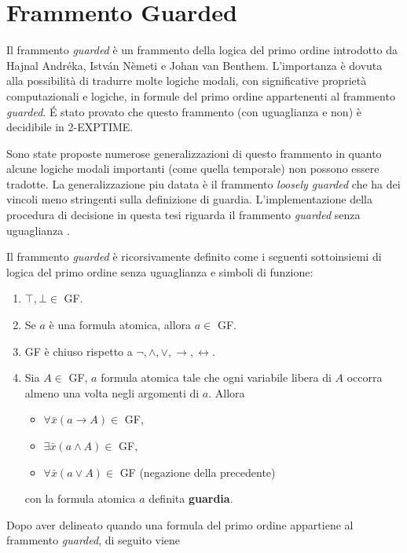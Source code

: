 \let\cleardoublepage\relax
\chapter{Frammento Guarded}
Il frammento \emph{guarded} è un frammento della logica del primo ordine introdotto da Hajnal Andréka,
István Nèmeti e Johan van Benthem. L'importanza è dovuta alla possibilità  di tradurre 
molte logiche modali, con significative proprietà computazionali e logiche, in formule del primo ordine 
appartenenti al frammento \emph{guarded}. \'E stato provato che questo frammento (con uguaglianza e non) 
è decidibile in \textsc{2-EXPTIME}. 

Sono state proposte numerose generalizzazioni di questo frammento in quanto
alcune logiche modali importanti (come quella temporale) non possono essere tradotte. La generalizzazione 
piu datata è il frammento \emph{loosely guarded} che ha dei vincoli meno stringenti sulla definizione di guardia.
L'implementazione della procedura di decisione in questa tesi riguarda il frammento \emph{guarded} senza uguaglianza \cite{de2003deciding}.
\begin{definition}
    Il frammento \emph{guarded} è ricorsivamente definito come i seguenti sottoinsiemi di logica del primo ordine senza
    uguaglianza e simboli di funzione:
    \begin{enumerate}
        \item $\top,\bot\in$ GF.
        \item Se $a$ è una formula atomica, allora $a\in$ GF.
        \item GF è chiuso rispetto a $\lnot, \land,
        \lor, \rightarrow, \leftrightarrow$.
        \item Sia $A\in$ GF, $a$ formula atomica tale che ogni variabile libera di $A$ occorra almeno una volta negli argomenti 
        di $a$. Allora 
        \begin{itemize}
            \item $\forall\bar{x}(a \rightarrow A)\in$ GF,
            \item $\exists\bar{x}(a \land A)\in$ GF,
            \item $\forall\bar{x}(a \lor A)\in$ GF (negazione della precedente)
        \end{itemize}
        con la formula atomica $a$ definita \textbf{guardia}.
    \end{enumerate}
\end{definition}
Dopo aver delineato quando una formula del primo ordine appartiene al frammento \emph{guarded}, di seguito viene 
